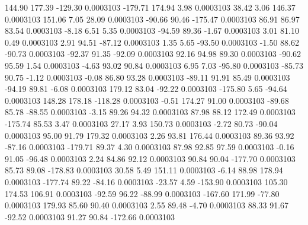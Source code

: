       144.90      177.39     -129.30     0.0003103
     -179.71      174.94        3.98     0.0003103
       38.42        3.06      146.37     0.0003103
      151.06        7.05       28.09     0.0003103
      -90.66       90.46     -175.47     0.0003103
       86.91       86.97       83.54     0.0003103
       -8.18        6.51        5.35     0.0003103
      -94.59       89.36       -1.67     0.0003103
        3.01       81.10        0.49     0.0003103
        2.91       94.51      -87.12     0.0003103
        1.35        5.65      -93.50     0.0003103
       -1.50       88.62      -90.73     0.0003103
      -92.37       91.35      -92.09     0.0003103
       92.16       94.98       89.30     0.0003103
      -90.62       95.59        1.54     0.0003103
       -4.63       93.02       90.84     0.0003103
        6.95        7.03      -95.80     0.0003103
      -85.73       90.75       -1.12     0.0003103
       -0.08       86.80       93.28     0.0003103
      -89.11       91.91       85.49     0.0003103
      -94.19       89.81       -6.08     0.0003103
      179.12       83.04      -92.22     0.0003103
     -175.80        5.65      -94.64     0.0003103
      148.28      178.18     -118.28     0.0003103
       -0.51      174.27       91.00     0.0003103
      -89.68       85.78      -88.55     0.0003103
       -3.15       89.26       94.32     0.0003103
       87.98       88.12      172.49     0.0003103
     -175.74       85.53        3.47     0.0003103
       27.17        3.93      150.73     0.0003103
       -2.72       80.73      -90.04     0.0003103
       95.00       91.79      179.32     0.0003103
        2.26       93.81      176.44     0.0003103
       89.36       93.92      -87.16     0.0003103
     -179.71       89.37        4.30     0.0003103
       87.98       92.85       97.59     0.0003103
       -0.16       91.05      -96.48     0.0003103
        2.24       84.86       92.12     0.0003103
       90.84       90.04     -177.70     0.0003103
       85.73       89.08     -178.83     0.0003103
       30.58        5.49      151.11     0.0003103
       -6.14       88.98      178.94     0.0003103
     -177.74       89.22      -84.16     0.0003103
      -23.57        4.59     -153.90     0.0003103
      105.30      174.53      106.91     0.0003103
      -92.59       96.22      -88.99     0.0003103
     -167.60      171.99      -77.80     0.0003103
      179.93       85.60       90.40     0.0003103
        2.55       89.48       -4.70     0.0003103
       88.33       91.67      -92.52     0.0003103
       91.27       90.84     -172.66     0.0003103
